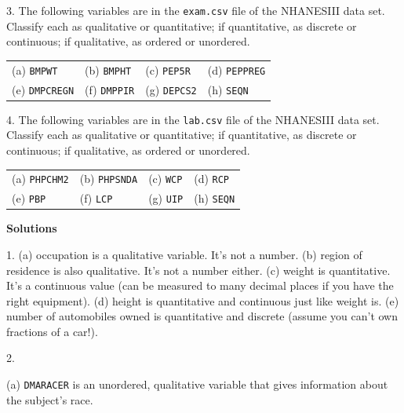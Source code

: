 \documentclass[10pt]{article}
\begin{document}
3. The following variables 
are in  the \texttt{exam.csv} file of the NHANESIII data set.
Classify each as qualitative or quantitative;  
if quantitative, as discrete or continuous;  if qualitative, as ordered or
unordered.\vspace{-5pt}
\begin{center}
{\setlength{\tabcolsep}{20pt}\begin{tabular}{llll}
(a) \texttt{BMPWT} & (b) \texttt{BMPHT} & (c) \texttt{PEP5R} & (d) \texttt{PEPPREG}\\[5pt]
(e) \texttt{DMPCREGN}    & (f) \texttt{DMPPIR}  & (g) \texttt{DEPCS2}  & (h) \texttt{SEQN}\\
\end{tabular}}
\end{center}

4. The following variables 
are in  the \texttt{lab.csv} file of the NHANESIII data set.
Classify each as qualitative or quantitative;  
if quantitative, as discrete or continuous;  if qualitative, as ordered or
unordered.\vspace{-5pt}
\begin{center}
{\setlength{\tabcolsep}{20pt}\begin{tabular}{llll}
(a) \texttt{PHPCHM2} & (b) \texttt{PHPSNDA} & (c) \texttt{WCP} & (d) \texttt{RCP}\\[5pt]
(e) \texttt{PBP}    & (f) \texttt{LCP}  & (g) \texttt{UIP}  & (h) \texttt{SEQN}\\
\end{tabular}}
\end{center}




\vfill
\eject

\begin{center}
\textbf{\large Solutions}
\end{center}

1. (a) occupation is a qualitative variable.  It's not a number.
(b) region of residence is also qualitative.  It's not a number either.
(c) weight is quantitative.  It's a continuous value (can be measured to many decimal places 
if you have the right equipment).
(d) height is quantitative and continuous just like weight is.
(e) number of automobiles owned is quantitative and discrete (assume you can't 
own fractions of a car!).
\bigskip

2. 

(a) \texttt{DMARACER} is an unordered, qualitative variable that gives information
about the subject's race.
\end{document}
